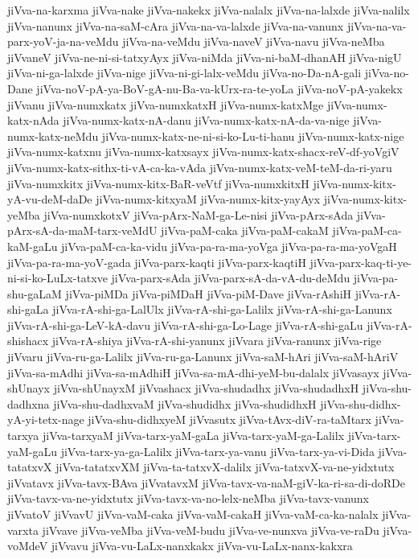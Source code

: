 {jiVva-na-karxma
jiVva-nake
jiVva-nakekx
jiVva-nalalx
jiVva-na-lalxde
jiVva-nalilx
jiVva-nanunx
jiVva-na-saM-cAra
jiVva-na-va-lalxde
jiVva-na-vanunx
jiVva-na-va-parx-yoV-ja-na-veMdu
jiVva-na-veMdu
jiVva-naveV
jiVva-navu
jiVva-neMba
jiVvaneV
jiVva-ne-ni-si-tatxyAyx
jiVva-niMda
jiVva-ni-baM-dhanAH
jiVva-nigU
jiVva-ni-ga-lalxde
jiVva-nige
jiVva-ni-gi-lalx-veMdu
jiVva-no-Da-nA-gali
jiVva-no-Dane
jiVva-noV-pA-ya-BoV-gA-nu-Ba-va-kUrx-ra-te-yoLa
jiVva-noV-pA-yakekx
jiVvanu
jiVva-numxkatx
jiVva-numxkatxH
jiVva-numx-katxMge
jiVva-numx-katx-nAda
jiVva-numx-katx-nA-danu
jiVva-numx-katx-nA-da-va-nige
jiVva-numx-katx-neMdu
jiVva-numx-katx-ne-ni-si-ko-Lu-ti-hanu
jiVva-numx-katx-nige
jiVva-numx-katxnu
jiVva-numx-katxsayx
jiVva-numx-katx-shacx-reV-df-yoVgiV
jiVva-numx-katx-sithx-ti-vA-ca-ka-vAda
jiVva-numx-katx-veM-teM-da-ri-yaru
jiVva-numxkitx
jiVva-numx-kitx-BaR-veVtf
jiVva-numxkitxH
jiVva-numx-kitx-yA-vu-deM-daDe
jiVva-numx-kitxyaM
jiVva-numx-kitx-yayAyx
jiVva-numx-kitx-yeMba
jiVva-numxkotxV
jiVva-pArx-NaM-ga-Le-nisi
jiVva-pArx-sAda
jiVva-pArx-sA-da-maM-tarx-veMdU
jiVva-paM-caka
jiVva-paM-cakaM
jiVva-paM-ca-kaM-gaLu
jiVva-paM-ca-ka-vidu
jiVva-pa-ra-ma-yoVga
jiVva-pa-ra-ma-yoVgaH
jiVva-pa-ra-ma-yoV-gada
jiVva-parx-kaqti
jiVva-parx-kaqtiH
jiVva-parx-kaq-ti-ye-ni-si-ko-LuLx-tatxve
jiVva-parx-sAda
jiVva-parx-sA-da-vA-du-deMdu
jiVva-pa-shu-gaLaM
jiVva-piMDa
jiVva-piMDaH
jiVva-piM-Dave
jiVva-rAshiH
jiVva-rA-shi-gaLa
jiVva-rA-shi-ga-LalUlx
jiVva-rA-shi-ga-Lalilx
jiVva-rA-shi-ga-Lanunx
jiVva-rA-shi-ga-LeV-kA-davu
jiVva-rA-shi-ga-Lo-Lage
jiVva-rA-shi-gaLu
jiVva-rA-shishacx
jiVva-rA-shiya
jiVva-rA-shi-yanunx
jiVvara
jiVva-ranunx
jiVva-rige
jiVvaru
jiVva-ru-ga-Lalilx
jiVva-ru-ga-Lanunx
jiVva-saM-hAri
jiVva-saM-hAriV
jiVva-sa-mAdhi
jiVva-sa-mAdhiH
jiVva-sa-mA-dhi-yeM-bu-dalalx
jiVvasayx
jiVva-shUnayx
jiVva-shUnayxM
jiVvashacx
jiVva-shudadhx
jiVva-shudadhxH
jiVva-shu-dadhxna
jiVva-shu-dadhxvaM
jiVva-shudidhx
jiVva-shudidhxH
jiVva-shu-didhx-yA-yi-tetx-nage
jiVva-shu-didhxyeM
jiVvasutx
jiVva-tAvx-diV-ra-taMtarx
jiVva-tarxya
jiVva-tarxyaM
jiVva-tarx-yaM-gaLa
jiVva-tarx-yaM-ga-Lalilx
jiVva-tarx-yaM-gaLu
jiVva-tarx-ya-ga-Lalilx
jiVva-tarx-ya-vanu
jiVva-tarx-ya-vi-Dida
jiVva-tatatxvX
jiVva-tatatxvXM
jiVva-ta-tatxvX-dalilx
jiVva-tatxvX-va-ne-yidxtutx
jiVvatavx
jiVva-tavx-BAva
jiVvatavxM
jiVva-tavx-va-naM-giV-ka-ri-sa-di-doRDe
jiVva-tavx-va-ne-yidxtutx
jiVva-tavx-va-no-lelx-neMba
jiVva-tavx-vanunx
jiVvatoV
jiVvavU
jiVva-vaM-caka
jiVva-vaM-cakaH
jiVva-vaM-ca-ka-nalalx
jiVva-varxta
jiVvave
jiVva-veMba
jiVva-veM-budu
jiVva-ve-nunxva
jiVva-ve-raDu
jiVva-voMdeV
jiVvavu
jiVva-vu-LaLx-nanxkakx
jiVva-vu-LaLx-nanx-kakxra
}
